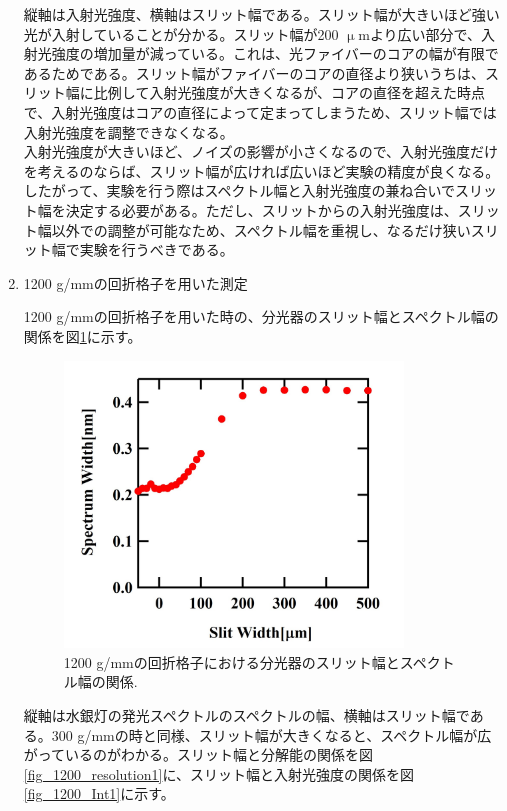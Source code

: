 \documentclass[11pt,a4j]{jsarticle}
\begin{document}
\begin{enumerate}
       縦軸は入射光強度、横軸はスリット幅である。スリット幅が大きいほど強い光が入射していることが分かる。スリット幅が200 $\upmu$mより広い部分で、入射光強度の増加量が減っている。これは、光ファイバーのコアの幅が有限であるためである。スリット幅がファイバーのコアの直径より狭いうちは、スリット幅に比例して入射光強度が大きくなるが、コアの直径を超えた時点で、入射光強度はコアの直径によって定まってしまうため、スリット幅では入射光強度を調整できなくなる。\\
       入射光強度が大きいほど、ノイズの影響が小さくなるので、入射光強度だけを考えるのならば、スリット幅が広ければ広いほど実験の精度が良くなる。したがって、実験を行う際はスペクトル幅と入射光強度の兼ね合いでスリット幅を決定する必要がある。ただし、スリットからの入射光強度は、スリット幅以外での調整が可能なため、スペクトル幅を重視し、なるだけ狭いスリット幅で実験を行うべきである。

       \newpage

 \item 1200 g/mmの回折格子を用いた測定


       1200 g/mmの回折格子を用いた時の、分光器のスリット幅とスペクトル幅の関係を図\ref{fig_1200spectrum1}に示す。

       \begin{figure}[ht]
        \centering
        \includegraphics[clip,width=9cm]{start1_1200Spectrum.jpg}
        \caption{1200 g/mmの回折格子における分光器のスリット幅とスペクトル幅の関係.}
        \label{fig_1200spectrum1}
       \end{figure}


       縦軸は水銀灯の発光スペクトルのスペクトルの幅、横軸はスリット幅である。300 g/mmの時と同様、スリット幅が大きくなると、スペクトル幅が広がっているのがわかる。スリット幅と分解能の関係を図\ref{fig_1200_resolution1}に、スリット幅と入射光強度の関係を図\ref{fig_1200_Int1}に示す。


\end{enumerate}
\end{document}
